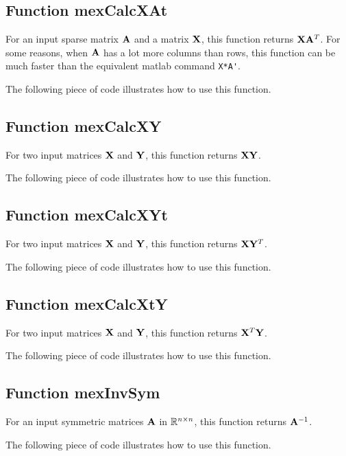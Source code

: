 \documentclass[a4paper, 11pt]{article}
\begin{document}
\subsection{Function mexCalcXAt}
For an input sparse matrix ${\mathbf A}$ and a matrix ${\mathbf X}$, this function returns ${\mathbf X}{\mathbf A}^T$. For some reasons, when ${\mathbf A}$ has a lot more columns than rows, this function can be much faster than the equivalent matlab command \verb|X*A'|.
%    

The following piece of code illustrates how to use this function.




\subsection{Function mexCalcXY}
For two input matrices ${\mathbf X}$ and ${\mathbf Y}$, this function returns ${\mathbf X}{\mathbf Y}$.
%    

The following piece of code illustrates how to use this function.




\subsection{Function mexCalcXYt}
For two input matrices ${\mathbf X}$ and ${\mathbf Y}$, this function returns ${\mathbf X}{\mathbf Y}^T$.
%    

The following piece of code illustrates how to use this function.




\subsection{Function mexCalcXtY}
For two input matrices ${\mathbf X}$ and ${\mathbf Y}$, this function returns ${\mathbf X}^T{\mathbf Y}$.
%    

The following piece of code illustrates how to use this function.




\subsection{Function mexInvSym}
For an input symmetric matrices ${\mathbf A}$ in ${\mathbb R}^{n \times n}$, this function returns ${\mathbf A}^{-1}$.
%    

The following piece of code illustrates how to use this function.

\end{document}
